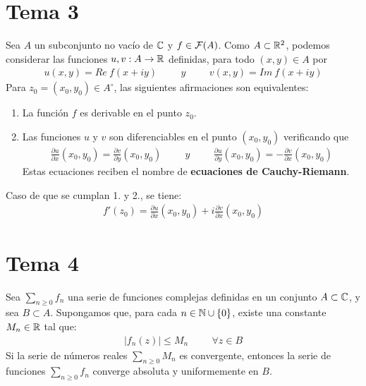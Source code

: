\documentclass[12pt]{article}
\begin{document}
    \section{Tema 3}

    \begin{teo}
        Sea $A$ un subconjunto no vacío de $\mathbb{C}$ y $f\in \mathcal{F}(A)$. Como $A\subset \mathbb{R}^2$, podemos considerar las funciones $u,v:A \to \mathbb{R}$ definidas, para todo $(x,y)\in A$ por
        \begin{gather*}
            u(x,y) = Re\ f(x+iy) \hspace{1cm} y \hspace{1cm} v(x,y) = Im\ f(x+iy)
        \end{gather*}
        Para $z_0=(x_0,y_0)\in A^\circ$, las siguientes afirmaciones son equivalentes:
        \begin{enumerate}
            \item La función $f$ es derivable en el punto $z_0$.
            \item Las funciones $u$ y $v$ son diferenciables en el punto $(x_0, y_0)$ verificando que 
            \begin{gather*}
                \frac{\partial u}{\partial x} (x_0, y_0) = \frac{\partial v}{\partial y} (x_0, y_0) \hspace{1cm} y \hspace{1cm} \frac{\partial u}{\partial y} (x_0, y_0) = -\frac{\partial v}{\partial x} (x_0, y_0)
            \end{gather*}
            Estas ecuaciones reciben el nombre de \textbf{ecuaciones de Cauchy-Riemann}.
        \end{enumerate}
        Caso de que se cumplan 1. y 2., se tiene:
        \begin{gather*}
            f'(z_0) = \frac{\partial u}{\partial x} (x_0, y_0) + i \frac{\partial v}{\partial x} (x_0, y_0)
        \end{gather*}
    \end{teo}

    \newpage

    \section{Tema 4}

    \begin{teo}
        Sea $\sum\limits_{n\geq 0} f_n$ una serie de funciones complejas definidas en un conjunto $A\subset \mathbb{C}$, y sea $B\subset A$. Supongamos que, para cada $n\in \mathbb{N}\cup \{0\}$, existe una constante $M_n\in \mathbb{R}$ tal que:
        \begin{gather*}
            |f_n(z)| \leq M_n \hspace{1cm} \forall z \in B
        \end{gather*}
        Si la serie de números reales $\sum\limits_{n\geq 0} M_n$ es convergente, entonces la serie de funciones $\sum\limits_{n\geq 0} f_n$ converge absoluta y uniformemente en $B$.
    \end{teo}
\end{document}
